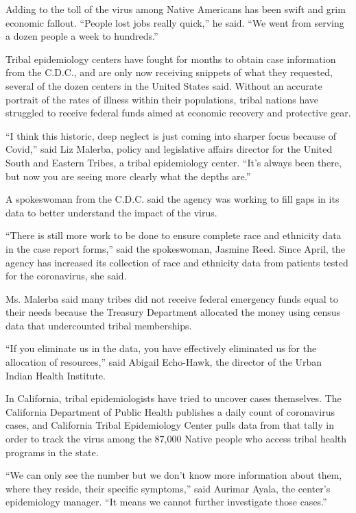 Adding to the toll of the virus among Native Americans has been swift
and grim economic fallout. ``People lost jobs really quick,'' he said.
``We went from serving a dozen people a week to hundreds.''

Tribal epidemiology centers have fought for months to obtain case
information from the C.D.C., and are only now receiving snippets of what
they requested, several of the dozen centers in the United States said.
Without an accurate portrait of the rates of illness within their
populations, tribal nations have struggled to receive federal funds
aimed at economic recovery and protective gear.

``I think this historic, deep neglect is just coming into sharper focus
because of Covid,'' said Liz Malerba, policy and legislative affairs
director for the United South and Eastern Tribes, a tribal epidemiology
center. ``It's always been there, but now you are seeing more clearly
what the depths are.''

A spokeswoman from the C.D.C. said the agency was working to fill gaps
in its data to better understand the impact of the virus.

``There is still more work to be done to ensure complete race and
ethnicity data in the case report forms,'' said the spokeswoman, Jasmine
Reed. Since April, the agency has increased its collection of race and
ethnicity data from patients tested for the coronavirus, she said.

Ms. Malerba said many tribes did not receive federal emergency funds
equal to their needs because the Treasury Department allocated the money
using census data that undercounted tribal memberships.

``If you eliminate us in the data, you have effectively eliminated us
for the allocation of resources,'' said Abigail Echo-Hawk, the director
of the Urban Indian Health Institute.

In California, tribal epidemiologists have tried to uncover cases
themselves. The California Department of Public Health publishes a daily
count of coronavirus cases, and California Tribal Epidemiology Center
pulls data from that tally in order to track the virus among the 87,000
Native people who access tribal health programs in the state.

``We can only see the number but we don't know more information about
them, where they reside, their specific symptoms,'' said Aurimar Ayala,
the center's epidemiology manager. ``It means we cannot further
investigate those cases.''

